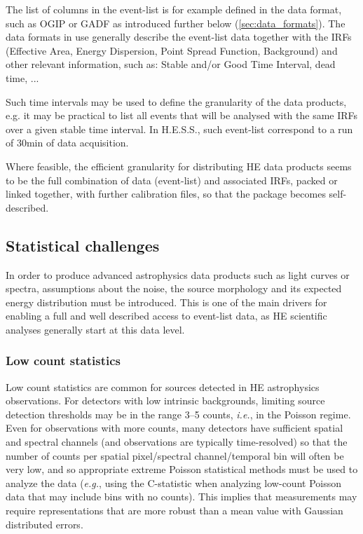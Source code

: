 \documentclass[11pt,a4paper]{ivoa}
\begin{document}
The list of columns in the event-list is for example defined in the data format,
such as OGIP or GADF as introduced further below (\ref{sec:data_formats}). The data formats in use generally describe the event-list data together
with the IRFs (Effective Area, Energy Dispersion, Point Spread Function, Background) and other relevant information, such
as: Stable and/or Good Time Interval, dead time, ...

Such time intervals may be used to define the granularity of the data products, e.g. it may be practical to list all events that will be analysed with the same IRFs over a given stable time interval. In H.E.S.S., such event-list correspond to a run of 30min of data acquisition.

Where feasible, the efficient granularity for distributing HE data products seems to be the full combination of data (event-list) and associated IRFs, packed or linked together, with further calibration files, so that the package becomes self-described.



\subsection{Statistical challenges}

In order to produce advanced astrophysics data products such as light curves or spectra, assumptions
about the noise, the source morphology and its expected energy distribution must be introduced. This is one of the main
drivers for enabling a full and well described access to event-list data, as HE scientific analyses generally start at this data level.

\subsubsection{Low count statistics}

Low count statistics are common for sources detected in HE astrophysics observations.  For detectors with low intrinsic backgrounds, limiting source detection thresholds may be in the range 3--5 counts, {\em i.e.\/}, in the Poisson regime.  Even for observations with more counts, many detectors have sufficient spatial and spectral channels (and observations are typically time-resolved) so that the number of counts per spatial pixel/spectral channel/temporal bin will often be very low, and so appropriate extreme Poisson statistical methods must be used to analyze the data ({\em e.g.\/}, using the C-statistic when analyzing low-count Poisson data that may include bins with no counts).  This implies that measurements may require representations that are more robust than a mean value with Gaussian distributed errors.
\end{document}
